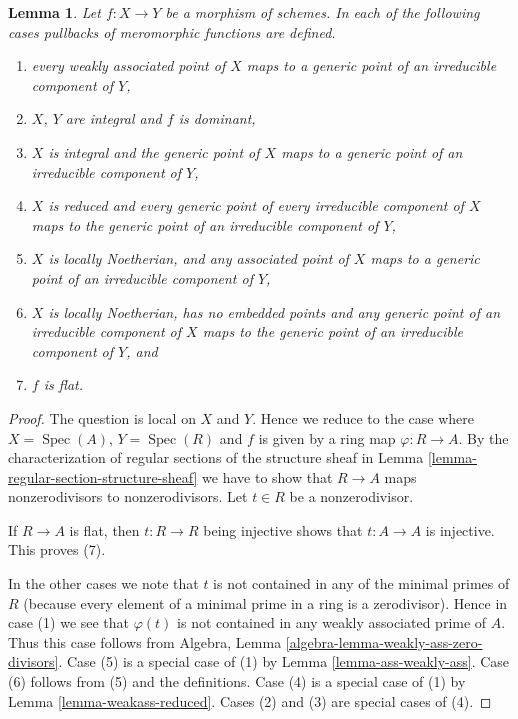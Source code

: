 \documentclass[10pt,a4paper]{amsart}
\theoremstyle{plain}
\newtheorem{lemma}[subsection]{Lemma}
\theoremstyle{definition}
\theoremstyle{remark}
\numberwithin{equation}{subsection}
\def\Spec{\mathop{\mathrm{Spec}}}
\begin{document}
\begin{lemma}
\label{lemma-pullback-meromorphic-sections-defined}
Let $f : X \to Y$ be a morphism of schemes.
In each of the following cases pullbacks of meromorphic
functions are defined.
\begin{enumerate}
\item every weakly associated point of $X$ maps to
a generic point of an irreducible component of $Y$,
\item $X$, $Y$ are integral and $f$ is dominant,
\item $X$ is integral and the generic point of $X$ maps
to a generic point of an irreducible component of $Y$,
\item $X$ is reduced and every generic point of every irreducible
component of $X$ maps to the generic point of an irreducible component
of $Y$,
\item $X$ is locally Noetherian, and any associated point of
$X$ maps to a generic point of an irreducible component of $Y$,
\item $X$ is locally Noetherian, has no embedded points and
any generic point of an irreducible component of
$X$ maps to the generic point of an irreducible component of $Y$, and
\item $f$ is flat.
\end{enumerate}
\end{lemma}

\begin{proof}
The question is local on $X$ and $Y$. Hence we reduce to the case where
$X = \Spec(A)$, $Y = \Spec(R)$ and $f$ is given by a ring map
$\varphi : R \to A$.
By the characterization of regular sections of the structure sheaf
in Lemma \ref{lemma-regular-section-structure-sheaf} we have to
show that $R \to A$ maps nonzerodivisors to nonzerodivisors.
Let $t \in R$ be a nonzerodivisor.

\medskip\noindent
If $R \to A$ is flat, then $t : R \to R$ being injective
shows that $t : A \to A$ is injective. This proves (7).

\medskip\noindent
In the other cases we note that $t$ is not contained in any of
the minimal primes of $R$ (because every element of a minimal
prime in a ring is a zerodivisor).
Hence in case (1) we see that $\varphi(t)$ is not contained
in any weakly associated prime of $A$. Thus this case follows from
Algebra, Lemma \ref{algebra-lemma-weakly-ass-zero-divisors}.
Case (5) is a special case of (1) by Lemma \ref{lemma-ass-weakly-ass}.
Case (6) follows from (5) and the definitions.
Case (4) is a special case of (1) by
Lemma \ref{lemma-weakass-reduced}.
Cases (2) and (3) are special cases of (4).
\end{proof}
\end{document}
